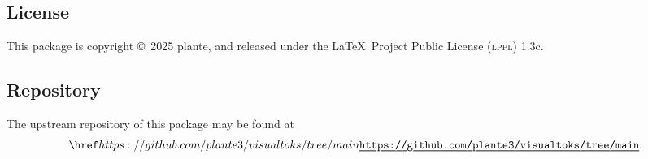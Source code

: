 \documentclass[11pt]{article}
\begin{document}
\subsection*{License}

This package is copyright \copyright\ 2025 plante, and
released under the \LaTeX\ Project Public License (\textsc{lppl}) 1.3c.

\subsection*{Repository}

The upstream repository of this package may be found at
	\[ \link{https://github.com/plante3/visualtoks/tree/main}. \]
\end{document}
